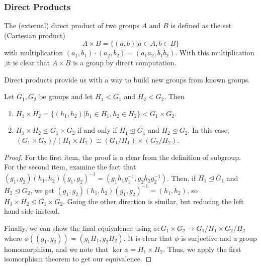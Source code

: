 \documentclass[11pt,leqno,oneside]{amsart}
\newcommand{\subgroup}{\mathrel{<}}
\newcommand{\normsubgroup}{\mathrel{\unlhd}}
\newcommand{\isom}{\mathrel{\cong}}
\begin{document}
\subsubsection*{Direct Products}

\begin{defn}
    The (external) direct product of two groups $A$ and $B$ is defined as the set (Cartesian product) \[
        A \times B = \{(a,b) | a \in A, b \in B \}
    \] with multiplication $(a_1,b_1) \cdot (a_2,b_2) = (a_1a_2,b_1b_2)$. With this multiplication ,it is clear that $A \times B$ is a group by direct computation.
\end{defn}

Direct products provide us with a way to build new groups from known groups.

\begin{lem}
    Let $G_1, G_2$ be groups and let $H_1 \subgroup G_1$ and $H_2 \subgroup G_2$. Then
    \begin{enumerate}[label=(\alph*)]
        \item $H_1 \times H_2 = \{(h_1,h_2) | h_1 \in H_1, h_2 \in H_2\} \subgroup G_1 \times G_2$.
        \item $H_1 \times H_2 \normsubgroup G_1 \times G_2$ if and only if $H_1 \normsubgroup G_1$ and $H_2 \normsubgroup G_2$. In this case, $(G_1 \times G_2)/(H_1 \times H_2) \isom (G_1/H_1) \times (G_2/H_2)$.
    \end{enumerate}
\end{lem}
\begin{proof}
    For the first item, the proof is a clear from the definition of subgroup. \\

    For the second item, examine the fact that
    $(g_1,g_2)(h_1,h_2)(g_1,g_2)^{-1} = (g_1h_1g_1^{-1},g_2h_2g_2^{-1})$. Then,
    if $H_1 \normsubgroup G_1$ and $H_2 \normsubgroup G_2$, we get
    $(g_1,g_2)(h_1,h_2)(g_1,g_2)^{-1} = (h_1,h_2)$, so $H_1 \times H_2
    \normsubgroup G_1 \times G_2$. Going the other direction is similar, but
    reducing the left hand side instead.

    Finally, we can show the final equivalence using $\phi: G_1 \times G_2 \to
    G_1/H_1 \times G_2/H_2$ where $\phi( (g_1,g_2) ) = (g_1H_1, g_2H_2)$. It
    is clear that $\phi$ is surjective and a group homomorphism, and we note
    that $\ker \phi = H_1 \times H_2$. Thus, we apply the first isomorphism
    theorem to get our equivalence.
\end{proof}
\end{document}
